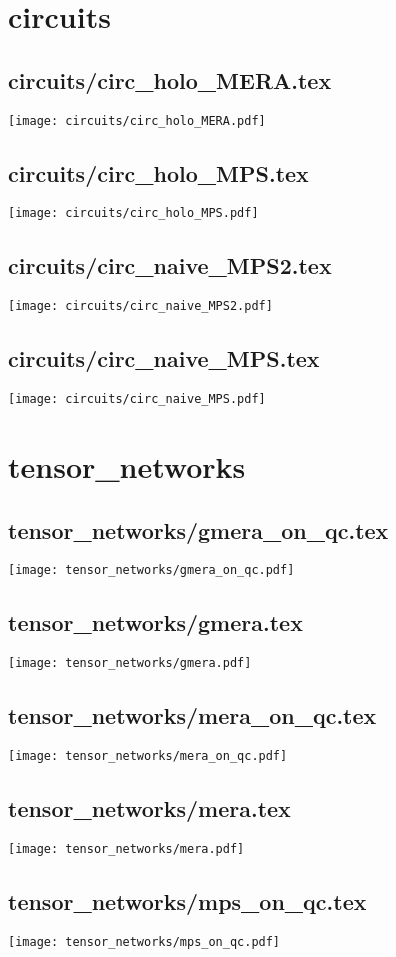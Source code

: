 \documentclass{article}
\begin{document}
	\section{circuits}
		\subsection{circuits/circ\_holo\_MERA.tex}
		\texttt{[image: circuits/circ\_holo\_MERA.pdf]}
		\subsection{circuits/circ\_holo\_MPS.tex}
		\texttt{[image: circuits/circ\_holo\_MPS.pdf]}
		\subsection{circuits/circ\_naive\_MPS2.tex}
		\texttt{[image: circuits/circ\_naive\_MPS2.pdf]}
		\subsection{circuits/circ\_naive\_MPS.tex}
		\texttt{[image: circuits/circ\_naive\_MPS.pdf]}
	\section{tensor\_networks}
		\subsection{tensor\_networks/gmera\_on\_qc.tex}
		\texttt{[image: tensor\_networks/gmera\_on\_qc.pdf]}
		\subsection{tensor\_networks/gmera.tex}
		\texttt{[image: tensor\_networks/gmera.pdf]}
		\subsection{tensor\_networks/mera\_on\_qc.tex}
		\texttt{[image: tensor\_networks/mera\_on\_qc.pdf]}
		\subsection{tensor\_networks/mera.tex}
		\texttt{[image: tensor\_networks/mera.pdf]}
		\subsection{tensor\_networks/mps\_on\_qc.tex}
		\texttt{[image: tensor\_networks/mps\_on\_qc.pdf]}
\end{document}
